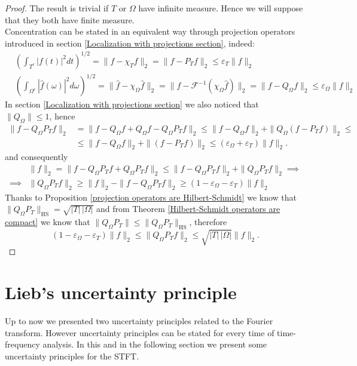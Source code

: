 \documentclass[corpo=11pt, stile=classica, tipotesi=custom,
greek, evenboxes, english]{toptesi}
\numberwithin{equation}{chapter}
\newcommand{\F}{\mathscr{F}} %
\begin{document}
\begin{proof}
	The result is trivial if $T$ or $\Omega$ have infinite measure. Hence we will suppose that they both have finite measure.\\
	Concentration can be stated in an equivalent way through projection operators introduced in section \ref{Localization with projections section}, indeed:
	\begin{align*}
		&\left( \int_{T^c} |f(t)|^2 dt\right)^{1/2} = \|f - \chi_T f\|_2  = \|f - P_T f\|_2 \leq \varepsilon_{T} \|f\|_2\\
		&\left( \int_{\Omega^c} |\hat{f}(\omega)|^2 d\omega\right)^{1/2} = \|\hat{f} - \chi_{\Omega} \hat{f} \|_2 = \|f - \F^{-1} (\chi_{\Omega} \hat{f}) \|_2 = \|f - Q_{\Omega}f \|_2 \leq \varepsilon_{\Omega} \|f\|_2
	\end{align*}
	In section \ref{Localization with projections section} we also noticed that $\|Q_{\Omega}\| \leq 1$, hence
	\begin{align*}
		\|f - Q_{\Omega}P_Tf \|_2 &= \|f - Q_{\Omega}f + Q_{\Omega}f - Q_{\Omega}P_T f \|_2 \leq \|f-Q_{\Omega}f \|_2 + \|Q_{\Omega}(f - P_T f) \|_2 \leq \\
								  &\leq \|f-Q_{\Omega}f \|_2 + \|(f - P_T f) \|_2 \leq (\varepsilon_{\Omega} + \varepsilon_T)\|f\|_2.
	\end{align*}
	and consequently
	\begin{align*}
		&\|f\|_2 = \|f - Q_{\Omega}P_T f + Q_{\Omega}P_T f \|_2 \leq \|f - Q_{\Omega}P_T f\|_2 + \| Q_{\Omega}P_T f  \|_2 \implies\\
		\implies &\|Q_{\Omega}P_T f \|_2 \geq \|f\|_2 - \|f - Q_{\Omega}P_T f\|_2 \geq (1-\varepsilon_{\Omega} - \varepsilon_T)\|f\|_2
	\end{align*}
	Thanks to Proposition \ref{projection operators are Hilbert-Schmidt} we know that $\| Q_{\Omega}P_T\|_{\mathrm{HS}} = \sqrt{|T| \, |\Omega|}$ and from Theorem \ref{Hilbert-Schmidt operators are compact} we know that $\|Q_{\Omega}P_T\| \leq \| Q_{\Omega}P_T\|_{\mathrm{HS}}$, therefore
	\begin{equation*}
		(1-\varepsilon_{\Omega} - \varepsilon_T)\|f\|_2 \leq \|Q_{\Omega}P_T f \|_2 \leq \sqrt{|T| \, |\Omega|} \|f\|_2.
	\end{equation*}
\end{proof}
\section{Lieb's uncertainty principle}\label{section Lieb's UP}
{\color{blue} Up to now we presented two uncertainty principles related to the Fourier transform}. {\color{red}However uncertainty principles can be stated for every time of time-frequency analysis}. {\color{blue}In this and in the following section we present some uncertainty principles for the STFT.}
\end{document}

